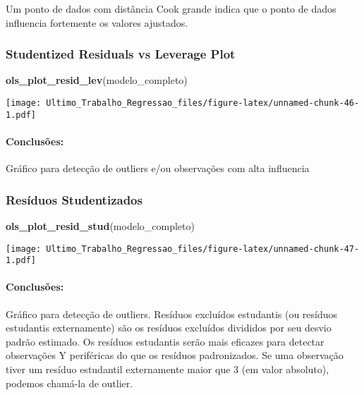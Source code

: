 \documentclass[
]{article}
\newenvironment{Shaded}{\begin{snugshade}}{\end{snugshade}}
\newcommand{\FunctionTok}[1]{\textcolor[rgb]{0.13,0.29,0.53}{\textbf{#1}}}
\newcommand{\NormalTok}[1]{#1}
\begin{document}
Um ponto de dados com distância Cook grande indica que o ponto de dados
influencia fortemente os valores ajustados.

\hypertarget{studentized-residuals-vs-leverage-plot}{%
\subsubsection{Studentized Residuals vs Leverage
Plot}\label{studentized-residuals-vs-leverage-plot}}

\begin{Shaded}
\begin{Highlighting}[]
\FunctionTok{ols\_plot\_resid\_lev}\NormalTok{(modelo\_completo)}
\end{Highlighting}
\end{Shaded}

\texttt{[image: Ultimo\_Trabalho\_Regressao\_files/figure-latex/unnamed-chunk-46-1.pdf]}

\hypertarget{conclusuxf5es-10}{%
\paragraph{Conclusões:}\label{conclusuxf5es-10}}

Gráfico para detecção de outliers e/ou observações com alta influencia

\hypertarget{resuxedduos-studentizados}{%
\subsubsection{Resíduos Studentizados}\label{resuxedduos-studentizados}}

\begin{Shaded}
\begin{Highlighting}[]
\FunctionTok{ols\_plot\_resid\_stud}\NormalTok{(modelo\_completo)}
\end{Highlighting}
\end{Shaded}

\texttt{[image: Ultimo\_Trabalho\_Regressao\_files/figure-latex/unnamed-chunk-47-1.pdf]}

\hypertarget{conclusuxf5es-11}{%
\paragraph{Conclusões:}\label{conclusuxf5es-11}}

Gráfico para detecção de outliers. Resíduos excluídos estudantis (ou
resíduos estudantis externamente) são os resíduos excluídos divididos
por seu desvio padrão estimado. Os resíduos estudantis serão mais
eficazes para detectar observações Y periféricas do que os resíduos
padronizados. Se uma observação tiver um resíduo estudantil externamente
maior que 3 (em valor absoluto), podemos chamá-la de outlier.
\end{document}
